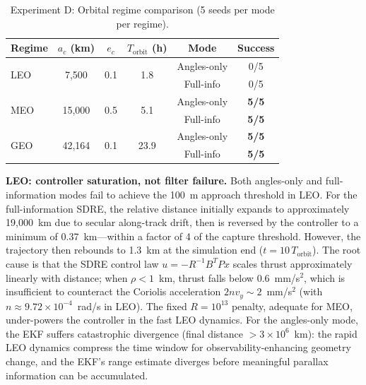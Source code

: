 \documentclass[preprint,3p,times]{elsarticle}
\begin{document}
\begin{table}[h]
\centering
\caption{Experiment D: Orbital regime comparison (5 seeds per mode per regime).}
\label{tab:expD}
\begin{tabular}{lccccc}
\toprule
Regime & $a_c$ (km) & $e_c$ & $T_{\text{orbit}}$ (h) & Mode & Success \\
\midrule
\multirow{2}{*}{LEO}  & \multirow{2}{*}{7,500}  & \multirow{2}{*}{0.1} & \multirow{2}{*}{1.8}  & Angles-only & 0/5 \\
                       &                         &                       &                        & Full-info   & 0/5 \\
\multirow{2}{*}{MEO}  & \multirow{2}{*}{15,000} & \multirow{2}{*}{0.5} & \multirow{2}{*}{5.1}  & Angles-only & \textbf{5/5} \\
                       &                         &                       &                        & Full-info   & \textbf{5/5} \\
\multirow{2}{*}{GEO}  & \multirow{2}{*}{42,164} & \multirow{2}{*}{0.1} & \multirow{2}{*}{23.9} & Angles-only & \textbf{5/5} \\
                       &                         &                       &                        & Full-info   & \textbf{5/5} \\
\bottomrule
\end{tabular}
\end{table}

\textbf{LEO: controller saturation, not filter failure.} Both angles-only and full-information modes fail to achieve the 100~m approach threshold in LEO. For the full-information SDRE, the relative distance initially expands to approximately 19,000~km due to secular along-track drift, then is reversed by the controller to a minimum of 0.37~km---within a factor of 4 of the capture threshold. However, the trajectory then rebounds to 1.3~km at the simulation end ($t = 10\,T_{\text{orbit}}$). The root cause is that the SDRE control law $u = -R^{-1} B^T P x$ scales thrust approximately linearly with distance; when $\rho < 1$~km, thrust falls below $0.6$~mm/s$^2$, which is insufficient to counteract the Coriolis acceleration $2 n v_y \sim 2$~mm/s$^2$ (with $n \approx 9.72 \times 10^{-4}$~rad/s in LEO). The fixed $R = 10^{13}$ penalty, adequate for MEO, under-powers the controller in the fast LEO dynamics. For the angles-only mode, the EKF suffers catastrophic divergence (final distance $> 3 \times 10^6$~km): the rapid LEO dynamics compress the time window for observability-enhancing geometry change, and the EKF's range estimate diverges before meaningful parallax information can be accumulated.
\end{document}
